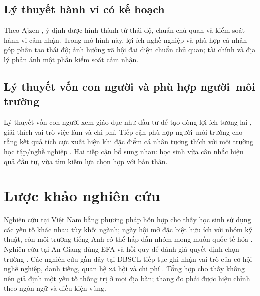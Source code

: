 \subsection{Lý thuyết hành vi có kế hoạch}
Theo Ajzen \citep{ajzen1991}, ý định được hình thành từ thái độ, chuẩn chủ quan và kiểm soát hành vi cảm nhận. Trong mô hình này, lợi ích nghề nghiệp và phù hợp cá nhân góp phần tạo thái độ; ảnh hưởng xã hội đại diện chuẩn chủ quan; tài chính và địa lý phản ánh một phần kiểm soát cảm nhận.

\subsection{Lý thuyết vốn con người và phù hợp người--môi trường}
Lý thuyết vốn con người xem giáo dục như đầu tư để tạo dòng lợi ích tương lai \citep{becker1993}, giải thích vai trò việc làm và chi phí. Tiếp cận phù hợp người--môi trường cho rằng kết quả tích cực xuất hiện khi đặc điểm cá nhân tương thích với môi trường học tập/nghề nghiệp \citep{holland1997}. Hai tiếp cận bổ sung nhau: học sinh vừa cân nhắc hiệu quả đầu tư, vừa tìm kiếm lựa chọn hợp với bản thân.

\section{Lược khảo nghiên cứu}
Nghiên cứu tại Việt Nam bằng phương pháp hỗn hợp cho thấy học sinh sử dụng các yếu tố khác nhau tùy khối ngành; ngày hội mở đặc biệt hữu ích với nhóm kỹ thuật, còn môi trường tiếng Anh có thể hấp dẫn nhóm mong muốn quốc tế hóa \citep{le2022}. Nghiên cứu tại An Giang dùng EFA và hồi quy để đánh giá quyết định chọn trường \citep{hai2023}. Các nghiên cứu gần đây tại ĐBSCL tiếp tục ghi nhận vai trò của cơ hội nghề nghiệp, danh tiếng, quan hệ xã hội và chi phí \citep{nguyen2023,nguyen2026}. Tổng hợp cho thấy không nên giả định một yếu tố thống trị ở mọi địa bàn; thang đo phải được hiệu chỉnh theo ngôn ngữ và điều kiện vùng.

